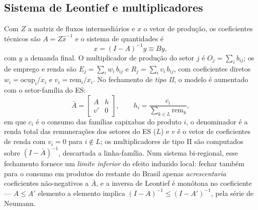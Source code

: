 \documentclass[11pt,a4paper]{article}
\begin{document}
\subsection{Sistema de Leontief e multiplicadores}
\label{ap:leontief}
Com $Z$ a matriz de fluxos intermediários e $x$ o vetor de produção, os coeficientes técnicos
são $A=Z\hat{x}^{-1}$ e o sistema de quantidades é
\begin{equation}
x=(I-A)^{-1}y \equiv By,
\label{eq:leontief}
\end{equation}
com $y$ a demanda final. O multiplicador de produção do setor $j$ é $O_j=\sum_i b_{ij}$; os de
emprego e renda são $E_j=\sum_i w_i\,b_{ij}$ e $R_j=\sum_i v_i\,b_{ij}$, com coeficientes
diretos $w_i=\mathrm{ocup}_i/x_i$ e $v_i=\mathrm{rem}_i/x_i$. No fechamento de
\emph{tipo II}, o modelo é aumentado com o setor-família do ES:
\begin{equation}
\bar{A}=\begin{bmatrix} A & h\\ v' & 0\end{bmatrix},
\qquad h_i=\frac{c_i}{\sum_{k\in L}\mathrm{rem}_k},
\label{eq:tipo2}
\end{equation}
em que $c_i$ é o consumo das famílias capixabas do produto $i$, o denominador é a renda
total das remunerações dos setores do ES ($L$) e $v$ é o vetor de coeficientes de renda
com $v_i=0$ para $i\notin L$; os multiplicadores de tipo II são computados sobre
$(I-\bar{A})^{-1}$, descartada a linha-família. Num sistema bi-regional, esse fechamento
fornece um \emph{limite inferior} do efeito induzido local: fechar também para o consumo
em produtos do restante do Brasil apenas \emph{acrescentaria} coeficientes não-negativos
a $\bar{A}$, e a inversa de Leontief é monótona no coeficiente --- $A\le A'$ elemento a
elemento implica $(I-A)^{-1}\le(I-A')^{-1}$, pela série de Neumann.
\end{document}
